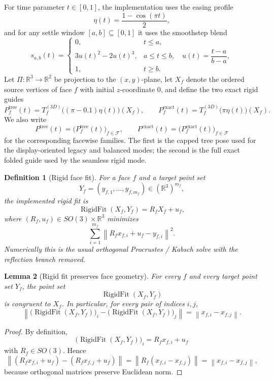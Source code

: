\documentclass[11pt]{article}
\newtheorem{definition}{Definition}[section]
\newtheorem{lemma}[definition]{Lemma}
\theoremstyle{remark}
\newcommand{\RR}{\mathbb{R}}
\newcommand{\norm}[1]{\left\lVert #1 \right\rVert}
\begin{document}
For time parameter $t\in[0,1]$, the implementation uses the easing profile
\[
\eta(t)=\frac{1-\cos(\pi t)}{2},
\]
and for any settle window $[a,b]\subseteq[0,1]$ it uses the smoothstep blend
\[
s_{a,b}(t)=
\begin{cases}
0,& t\le a,\\[2mm]
3u(t)^2-2u(t)^3,& a\le t\le b,\quad
u(t)=\dfrac{t-a}{b-a},\\[2mm]
1,& t\ge b.
\end{cases}
\]
Let $\Pi:\RR^3\to\RR^2$ be projection to the $(x,y)$-plane, let $X_f$ denote
the ordered source vertices of face $f$ with initial $z$-coordinate $0$, and
define the two exact rigid guides
\[
P_f^{\mathrm{tree}}(t)
=
T_f^{(3D)}\bigl((\pi-0.1)\eta(t)\bigr)(X_f),
\qquad
P_f^{\mathrm{exact}}(t)
=
T_f^{(3D)}\bigl(\pi\eta(t)\bigr)(X_f).
\]
We also write
\[
P^{\mathrm{tree}}(t)=\bigl(P_f^{\mathrm{tree}}(t)\bigr)_{f\in\mathcal F},
\qquad
P^{\mathrm{exact}}(t)=\bigl(P_f^{\mathrm{exact}}(t)\bigr)_{f\in\mathcal F}
\]
for the corresponding facewise families.
The first is the capped tree pose used for the display-oriented legacy and
balanced modes; the second is the full exact folded guide used by the seamless
rigid mode.

\begin{definition}[Rigid face fit]
For a face $f$ and a target point set
\[
Y_f=(y_{f,1},\dots,y_{f,m_f})\in(\RR^3)^{m_f},
\]
the implemented rigid fit is
\[
\operatorname{RigidFit}(X_f,Y_f)=R_fX_f+u_f,
\]
where $(R_f,u_f)\in SO(3)\times\RR^3$ minimizes
\[
\sum_{i=1}^{m_f}\norm{R_fx_{f,i}+u_f-y_{f,i}}^2.
\]
Numerically this is the usual orthogonal Procrustes / Kabsch solve with the
reflection branch removed.
\end{definition}

\begin{lemma}[Rigid fit preserves face geometry]
For every $f$ and every target point set $Y_f$, the point set
\[
\operatorname{RigidFit}(X_f,Y_f)
\]
is congruent to $X_f$. In particular, for every pair of indices $i,j$,
\[
\norm{\bigl(\operatorname{RigidFit}(X_f,Y_f)\bigr)_i
-\bigl(\operatorname{RigidFit}(X_f,Y_f)\bigr)_j}
=
\norm{x_{f,i}-x_{f,j}}.
\]
\end{lemma}

\begin{proof}
By definition,
\[
\bigl(\operatorname{RigidFit}(X_f,Y_f)\bigr)_i
=
R_fx_{f,i}+u_f
\]
with $R_f\in SO(3)$. Hence
\[
\norm{(R_fx_{f,i}+u_f)-(R_fx_{f,j}+u_f)}
=
\norm{R_f(x_{f,i}-x_{f,j})}
=
\norm{x_{f,i}-x_{f,j}},
\]
because orthogonal matrices preserve Euclidean norm.
\end{proof}
\end{document}
